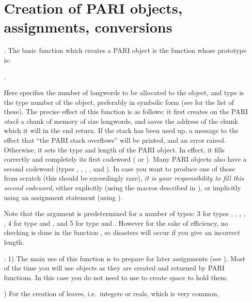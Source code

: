 \section{Creation of PARI objects, assignments, conversions}

.
The basic function which creates a PARI object is the function
 whose prototype is:

.

\noindent
Here  specifies the number of longwords to be allocated to the
object, and type is the type number of the object, preferably in symbolic
form (see  for the list of these). The precise effect of
this function is as follows: it first creates on the PARI \emph{stack} a
chunk of memory of size  longwords, and saves the address of the
chunk which it will in the end return.  If the stack has been used up, a
message to the effect that ``the PARI stack overflows'' will be printed,
and an error raised. Otherwise, it sets the type and length of the PARI object.
In effect, it fills correctly and completely its first codeword ( or
). Many PARI objects also have a second codeword (types ,
, , , and ). In case you want to
produce one of those from scratch (this should be exceedingly rare), \emph{it
is your responsibility to fill this second codeword}, either explicitly (using
the macros described in ), or implicitly using an assignment
statement (using ).

Note that the argument  is predetermined for a number of types:
3 for types , , , ,
, 4 for type  and , and 5 for type 
and . However for the sake of efficiency, no checking is done in the
function , so disasters will occur if you give an incorrect
length.

: 1)  The main use of this function is to prepare for later
assignments (see ). Most of the time you will use 
objects as they are created and returned by PARI functions. In this case you
do not need to use  to create space to hold them.

) For the creation of leaves, i.e.~integers or reals, which is
very common,


